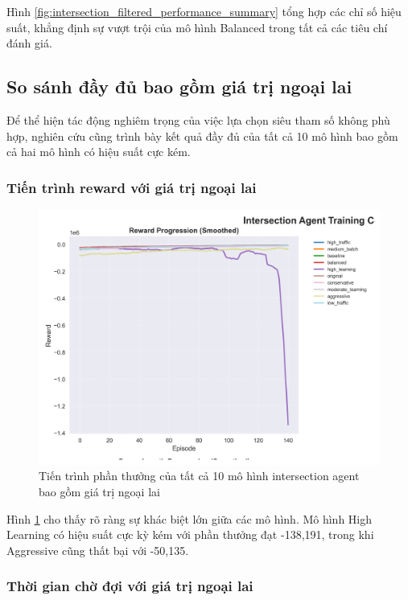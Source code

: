 Hình \ref{fig:intersection_filtered_performance_summary} tổng hợp các chỉ số
hiệu suất, khẳng định sự vượt trội của mô hình Balanced trong tất cả các tiêu chí
đánh giá.

\subsection{So sánh đầy đủ bao gồm giá trị ngoại lai}

Để thể hiện tác động nghiêm trọng của việc lựa chọn siêu tham số không phù hợp,
nghiên cứu cũng trình bày kết quả đầy đủ của tất cả 10 mô hình bao gồm cả hai mô
hình có hiệu suất cực kém.

\subsubsection{Tiến trình reward với giá trị ngoại lai}

\begin{figure}[!htp]
    \centering
    \includegraphics[width=\textwidth]{
        figures/individual_plots/intersection_full_reward_progress.png
    }
    \caption{Tiến trình phần thưởng của tất cả 10 mô hình intersection agent bao gồm giá trị ngoại lai}
    \label{fig:intersection_full_reward_progress}
\end{figure}

Hình \ref{fig:intersection_full_reward_progress} cho thấy rõ ràng sự khác biệt lớn
giữa các mô hình. Mô hình High Learning có hiệu suất cực kỳ kém với phần thưởng đạt -138,191,
trong khi Aggressive cũng thất bại với -50,135.

\subsubsection{Thời gian chờ đợi với giá trị ngoại lai}


